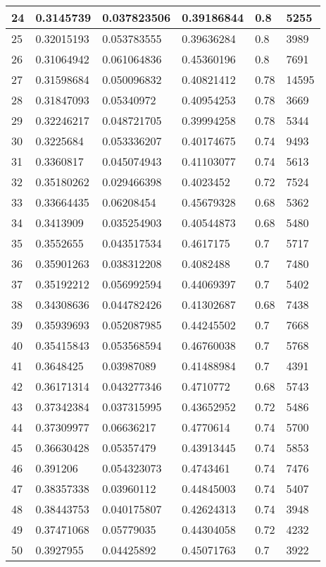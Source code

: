 \begin{longtable}{|l|l|l|l|l|l|}
24 & 0.3145739 & 0.037823506 & 0.39186844 & 0.8 & 5255 \\ \hline 
25 & 0.32015193 & 0.053783555 & 0.39636284 & 0.8 & 3989 \\ \hline 
26 & 0.31064942 & 0.061064836 & 0.45360196 & 0.8 & 7691 \\ \hline 
27 & 0.31598684 & 0.050096832 & 0.40821412 & 0.78 & 14595 \\ \hline 
28 & 0.31847093 & 0.05340972 & 0.40954253 & 0.78 & 3669 \\ \hline 
29 & 0.32246217 & 0.048721705 & 0.39994258 & 0.78 & 5344 \\ \hline 
30 & 0.3225684 & 0.053336207 & 0.40174675 & 0.74 & 9493 \\ \hline 
31 & 0.3360817 & 0.045074943 & 0.41103077 & 0.74 & 5613 \\ \hline 
32 & 0.35180262 & 0.029466398 & 0.4023452 & 0.72 & 7524 \\ \hline 
33 & 0.33664435 & 0.06208454 & 0.45679328 & 0.68 & 5362 \\ \hline 
34 & 0.3413909 & 0.035254903 & 0.40544873 & 0.68 & 5480 \\ \hline 
35 & 0.3552655 & 0.043517534 & 0.4617175 & 0.7 & 5717 \\ \hline 
36 & 0.35901263 & 0.038312208 & 0.4082488 & 0.7 & 7480 \\ \hline 
37 & 0.35192212 & 0.056992594 & 0.44069397 & 0.7 & 5402 \\ \hline 
38 & 0.34308636 & 0.044782426 & 0.41302687 & 0.68 & 7438 \\ \hline 
39 & 0.35939693 & 0.052087985 & 0.44245502 & 0.7 & 7668 \\ \hline 
40 & 0.35415843 & 0.053568594 & 0.46760038 & 0.7 & 5768 \\ \hline 
41 & 0.3648425 & 0.03987089 & 0.41488984 & 0.7 & 4391 \\ \hline 
42 & 0.36171314 & 0.043277346 & 0.4710772 & 0.68 & 5743 \\ \hline 
43 & 0.37342384 & 0.037315995 & 0.43652952 & 0.72 & 5486 \\ \hline 
44 & 0.37309977 & 0.06636217 & 0.4770614 & 0.74 & 5700 \\ \hline 
45 & 0.36630428 & 0.05357479 & 0.43913445 & 0.74 & 5853 \\ \hline 
46 & 0.391206 & 0.054323073 & 0.4743461 & 0.74 & 7476 \\ \hline 
47 & 0.38357338 & 0.03960112 & 0.44845003 & 0.74 & 5407 \\ \hline 
48 & 0.38443753 & 0.040175807 & 0.42624313 & 0.74 & 3948 \\ \hline 
49 & 0.37471068 & 0.05779035 & 0.44304058 & 0.72 & 4232 \\ \hline 
50 & 0.3927955 & 0.04425892 & 0.45071763 & 0.7 & 3922 \\ \hline 
\end{longtable}